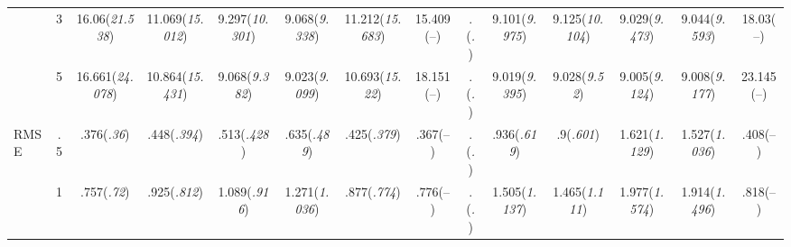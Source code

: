 \documentclass{article}
\begin{document}
\begin{table}[tbp]
{\begin{tabularx}{\textwidth}{lCCCCCCCCCCCCC}
&3&16.06\newline (\emph{21.538})&11.069\newline (\emph{15.012})&9.297\newline (\emph{10.301})&9.068\newline (\emph{9.338})&11.212\newline (\emph{15.683})&15.409\newline (--)&.\newline (\emph{.})&9.101\newline (\emph{9.975})&9.125\newline (\emph{10.104})&9.029\newline (\emph{9.473})&9.044\newline (\emph{9.593})&18.03\newline (--) \tabularnewline
&5&16.661\newline (\emph{24.078})&10.864\newline (\emph{15.431})&9.068\newline (\emph{9.382})&9.023\newline (\emph{9.099})&10.693\newline (\emph{15.22})&18.151\newline (--)&.\newline (\emph{.})&9.019\newline (\emph{9.395})&9.028\newline (\emph{9.52})&9.005\newline (\emph{9.124})&9.008\newline (\emph{9.177})&23.145\newline (--) \tabularnewline
\midrule RMSE&.5&.376\newline (\emph{.36})&.448\newline (\emph{.394})&.513\newline (\emph{.428})&.635\newline (\emph{.489})&.425\newline (\emph{.379})&.367\newline (--)&.\newline (\emph{.})&.936\newline (\emph{.619})&.9\newline (\emph{.601})&1.621\newline (\emph{1.129})&1.527\newline (\emph{1.036})&.408\newline (--) \tabularnewline
&1&.757\newline (\emph{.72})&.925\newline (\emph{.812})&1.089\newline (\emph{.916})&1.271\newline (\emph{1.036})&.877\newline (\emph{.774})&.776\newline (--)&.\newline (\emph{.})&1.505\newline (\emph{1.137})&1.465\newline (\emph{1.111})&1.977\newline (\emph{1.574})&1.914\newline (\emph{1.496})&.818\newline (--) \tabularnewline

\end{tabularx}}
\end{table}
\end{document}
